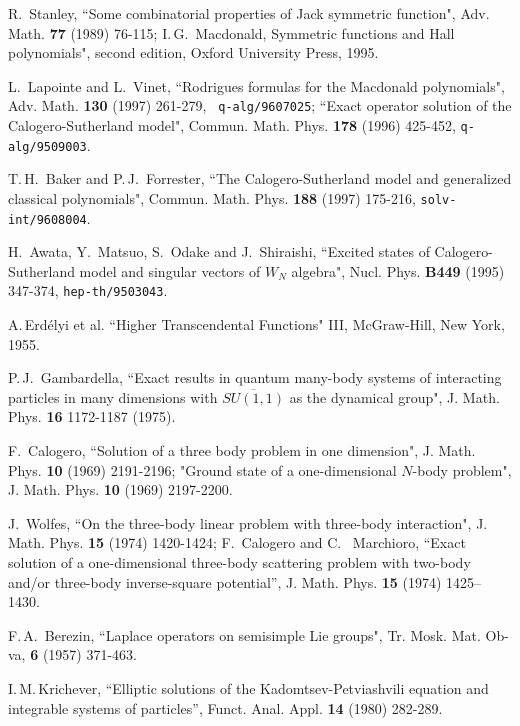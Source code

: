 \documentclass[a4paper,12pt]{article}
\begin{document}
\begin{thebibliography}{99}
R.\, Stanley, ``Some combinatorial properties of Jack symmetric function",
Adv. Math. {\bf 77} (1989) 76-115; I.\,G.\, Macdonald, Symmetric
functions and Hall polynomials", second edition, Oxford University Press,
1995.


L.\, Lapointe and L.\, Vinet, ``Rodrigues formulas for the Macdonald
polynomials",  Adv. Math. {\bf 130}  (1997) 261-279, {\tt
q-alg/9607025}; ``Exact operator solution of the Calogero-Sutherland
model", Commun. Math. Phys. {\bf 178} (1996) 425-452,
{\tt q-alg/9509003}.

T.\,H.\, Baker and P.\,J.\, Forrester, ``The Calogero-Sutherland model
and
generalized classical polynomials", Commun. Math. Phys. {\bf 188}
(1997) 175-216, {\tt solv-int/9608004}.

H.\, Awata, Y.\, Matsuo, S.\, Odake and J.\, Shiraishi,
``Excited states of Calogero-Sutherland model and singular vectors of
\(W_N\) algebra",
Nucl. Phys. {\bf B449} (1995) 347-374, {\tt hep-th/9503043}.

 A.\,Erd\'elyi et al. ``Higher Transcendental
Functions" III, McGraw-Hill, New York, 1955.



P.\,J.\, Gambardella, ``Exact results in quantum many-body systems of
interacting particles in many dimensions with \(\overline{SU(1,1)}\) as the
dynamical group",
J. Math. Phys. {\bf 16} 1172-1187 (1975).

F.\, Calogero, ``Solution of a three body problem in one dimension",
J. Math. Phys. {\bf 10} (1969) 2191-2196;
"Ground state of a one-dimensional \(N\)-body problem",
J. Math. Phys. {\bf 10} (1969) 2197-2200.


J.~Wolfes, ``On the three-body linear problem with three-body
interaction", J. Math. Phys. {\bf 15} (1974) 1420-1424;
F.~Calogero and C. ~Marchioro, ``Exact solution of a one-dimensional
three-body scattering problem with two-body and/or three-body
inverse-square potential'', J. Math. Phys. {\bf 15}
  (1974) 1425--1430.


F.\,A.\, Berezin, ``Laplace operators on semisimple Lie groups",
Tr. Mosk. Mat. Ob-va, {\bf 6} (1957) 371-463.



I.\,M.\,Krichever, ``Elliptic solutions of the
Kadomtsev-Petviashvili equation and integrable systems of particles'',
Funct. Anal. Appl. {\bf 14} (1980) 282-289.




\end{thebibliography}
\end{document}

